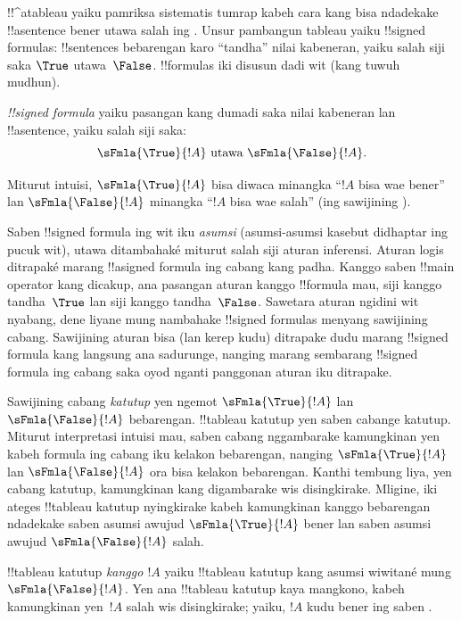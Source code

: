 \documentclass[../../../include/open-logic-section]{subfiles}
\begin{document}
      {}
      {}


!!^a{tableau} yaiku pamriksa sistematis tumrap kabeh cara kang bisa
ndadekake !!a{sentence} bener utawa salah ing . Unsur
pambangun tableau yaiku !!{signed formula}s: !!{sentence}s bebarengan
karo ``tandha'' nilai kabeneran, yaiku salah siji saka $\True$
utawa~$\False$. !!{formula}s iki disusun dadi wit (kang tuwuh
mudhun).

\begin{defn}
  \emph{!!{signed formula}} yaiku pasangan kang dumadi saka nilai
  kabeneran lan !!a{sentence}, yaiku salah siji saka:
  \[
  \sFmla{\True}{!A} \text{ utawa } \sFmla{\False}{!A}.
  \]
\end{defn}

Miturut intuisi, $\sFmla{\True}{!A}$ bisa diwaca minangka ``$!A$
bisa wae bener'' lan $\sFmla{\False}{!A}$ minangka ``$!A$ bisa wae
salah'' (ing sawijining ).

Saben !!{signed formula} ing wit iku \emph{asumsi}
(asumsi-asumsi kasebut didhaptar ing pucuk wit), utawa ditambahaké miturut salah siji aturan inferensi.
Aturan logis ditrapaké marang !!a{signed formula} ing cabang kang
padha. Kanggo saben !!{main operator} kang dicakup, ana pasangan
aturan kanggo !!{formula} mau, siji kanggo tandha~$\True$ lan
siji kanggo tandha~$\False$. Sawetara aturan ngidini wit nyabang, dene liyane mung
nambahake !!{signed formula}s menyang sawijining cabang. Sawijining
aturan bisa (lan kerep kudu) ditrapake dudu marang !!{signed formula}
kang langsung ana sadurunge, nanging marang sembarang
!!{signed formula} ing cabang saka oyod nganti panggonan aturan iku ditrapake.

Sawijining cabang \emph{katutup} yen ngemot $\sFmla{\True}{!A}$ lan
$\sFmla{\False}{!A}$ bebarengan. !!{tableau} katutup yen saben
cabange katutup. Miturut interpretasi intuisi mau, saben cabang
nggambarake kamungkinan yen kabeh formula ing cabang iku kelakon
bebarengan, nanging
$\sFmla{\True}{!A}$ lan $\sFmla{\False}{!A}$ ora bisa kelakon
bebarengan. Kanthi tembung liya, yen cabang katutup, kamungkinan kang
digambarake wis disingkirake. Mligine, iki ateges !!{tableau} katutup
nyingkirake kabeh kamungkinan kanggo bebarengan ndadekake saben asumsi
awujud $\sFmla{\True}{!A}$ bener lan saben asumsi awujud
$\sFmla{\False}{!A}$ salah.

!!{tableau} katutup \emph{kanggo $!A$} yaiku !!{tableau} katutup
kang asumsi wiwitané mung $\sFmla{\False}{!A}$. Yen ana !!{tableau} katutup kaya
mangkono, kabeh kamungkinan yen~$!A$ salah wis disingkirake; yaiku, $!A$
kudu bener ing saben .
\end{document}
